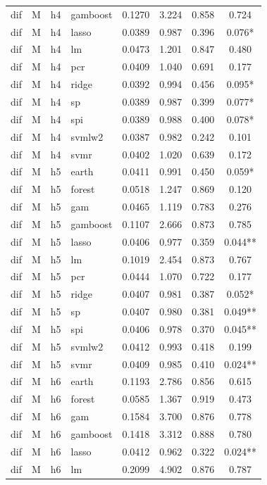 \begin{ThreePartTable}
\begin{longtable}[t]{llclcccc}
dif & M & h4 & gamboost & 0.1270 & 3.224 & 0.858 & 0.724\\
dif & M & h4 & lasso & 0.0389 & 0.987 & 0.396 & 0.076*\\
dif & M & h4 & lm & 0.0473 & 1.201 & 0.847 & 0.480\\
dif & M & h4 & pcr & 0.0409 & 1.040 & 0.691 & 0.177\\
dif & M & h4 & ridge & 0.0392 & 0.994 & 0.456 & 0.095*\\
dif & M & h4 & sp & 0.0389 & 0.987 & 0.399 & 0.077*\\
dif & M & h4 & spi & 0.0389 & 0.988 & 0.400 & 0.078*\\
dif & M & h4 & svmlw2 & 0.0387 & 0.982 & 0.242 & 0.101\\
dif & M & h4 & svmr & 0.0402 & 1.020 & 0.639 & 0.172\\
\addlinespace
dif & M & h5 & earth & 0.0411 & 0.991 & 0.450 & 0.059*\\
dif & M & h5 & forest & 0.0518 & 1.247 & 0.869 & 0.120\\
dif & M & h5 & gam & 0.0465 & 1.119 & 0.783 & 0.276\\
dif & M & h5 & gamboost & 0.1107 & 2.666 & 0.873 & 0.785\\
dif & M & h5 & lasso & 0.0406 & 0.977 & 0.359 & 0.044**\\
dif & M & h5 & lm & 0.1019 & 2.454 & 0.873 & 0.767\\
dif & M & h5 & pcr & 0.0444 & 1.070 & 0.722 & 0.177\\
dif & M & h5 & ridge & 0.0407 & 0.981 & 0.387 & 0.052*\\
dif & M & h5 & sp & 0.0407 & 0.980 & 0.381 & 0.049**\\
dif & M & h5 & spi & 0.0406 & 0.978 & 0.370 & 0.045**\\
dif & M & h5 & svmlw2 & 0.0412 & 0.993 & 0.418 & 0.199\\
dif & M & h5 & svmr & 0.0409 & 0.985 & 0.410 & 0.024**\\
\addlinespace
dif & M & h6 & earth & 0.1193 & 2.786 & 0.856 & 0.615\\
dif & M & h6 & forest & 0.0585 & 1.367 & 0.919 & 0.473\\
dif & M & h6 & gam & 0.1584 & 3.700 & 0.876 & 0.778\\
dif & M & h6 & gamboost & 0.1418 & 3.312 & 0.888 & 0.780\\
dif & M & h6 & lasso & 0.0412 & 0.962 & 0.322 & 0.024**\\
dif & M & h6 & lm & 0.2099 & 4.902 & 0.876 & 0.787\\

\end{longtable}
\end{ThreePartTable}
